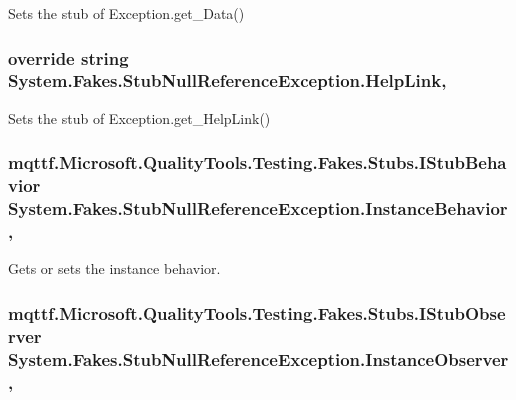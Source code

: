 Sets the stub of Exception.\-get\-\_\-\-Data()

\hypertarget{class_system_1_1_fakes_1_1_stub_null_reference_exception_acfa235d720d56f027c6fb55fc242e8fb}{
\subsubsection[{Help\-Link}]{\setlength{\rightskip}{0pt plus 5cm}override string System.\-Fakes.\-Stub\-Null\-Reference\-Exception.\-Help\-Link\hspace{0.3cm}{\ttfamily [get]}, {\ttfamily [set]}}}\label{class_system_1_1_fakes_1_1_stub_null_reference_exception_acfa235d720d56f027c6fb55fc242e8fb}


Sets the stub of Exception.\-get\-\_\-\-Help\-Link()

\hypertarget{class_system_1_1_fakes_1_1_stub_null_reference_exception_a55fb7756cf78b39daf47993a9269e933}{
\subsubsection[{Instance\-Behavior}]{\setlength{\rightskip}{0pt plus 5cm}mqttf.\-Microsoft.\-Quality\-Tools.\-Testing.\-Fakes.\-Stubs.\-I\-Stub\-Behavior System.\-Fakes.\-Stub\-Null\-Reference\-Exception.\-Instance\-Behavior\hspace{0.3cm}{\ttfamily [get]}, {\ttfamily [set]}}}\label{class_system_1_1_fakes_1_1_stub_null_reference_exception_a55fb7756cf78b39daf47993a9269e933}


Gets or sets the instance behavior.

\hypertarget{class_system_1_1_fakes_1_1_stub_null_reference_exception_a65097bafbdcd4353359774eecdb601e2}{
\subsubsection[{Instance\-Observer}]{\setlength{\rightskip}{0pt plus 5cm}mqttf.\-Microsoft.\-Quality\-Tools.\-Testing.\-Fakes.\-Stubs.\-I\-Stub\-Observer System.\-Fakes.\-Stub\-Null\-Reference\-Exception.\-Instance\-Observer\hspace{0.3cm}{\ttfamily [get]}, {\ttfamily [set]}}}\label{class_system_1_1_fakes_1_1_stub_null_reference_exception_a65097bafbdcd4353359774eecdb601e2}


